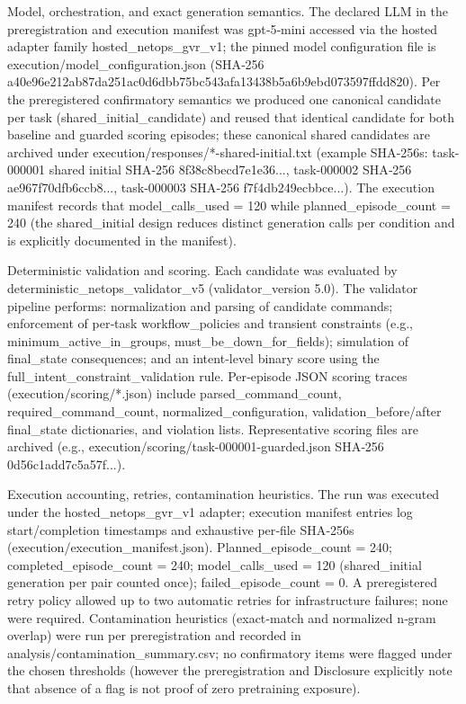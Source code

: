 \documentclass[conference]{IEEEtran}
\begin{document}
Model, orchestration, and exact generation semantics. The declared LLM in the preregistration and execution manifest was gpt‑5‑mini accessed via the hosted adapter family hosted\_netops\_gvr\_v1; the pinned model configuration file is execution/model\_configuration.json (SHA‑256 a40e96e212ab87da251ac0d6dbb75bc543afa13438b5a6b9ebd073597ffdd820). Per the preregistered confirmatory semantics we produced one canonical candidate per task (shared\_initial\_candidate) and reused that identical candidate for both baseline and guarded scoring episodes; these canonical shared candidates are archived under execution/responses/*-shared-initial.txt (example SHA‑256s: task-000001 shared initial SHA‑256 8f38c8becd7e1e36..., task-000002 SHA‑256 ae967f70dfb6ccb8..., task-000003 SHA‑256 f7f4db249ecbbce...). The execution manifest records that model\_calls\_used = 120 while planned\_episode\_count = 240 (the shared\_initial design reduces distinct generation calls per condition and is explicitly documented in the manifest).

Deterministic validation and scoring. Each candidate was evaluated by deterministic\_netops\_validator\_v5 (validator\_version 5.0). The validator pipeline performs: normalization and parsing of candidate commands; enforcement of per‑task workflow\_policies and transient constraints (e.g., minimum\_active\_in\_groups, must\_be\_down\_for\_fields); simulation of final\_state consequences; and an intent‑level binary score using the full\_intent\_constraint\_validation rule. Per‑episode JSON scoring traces (execution/scoring/*.json) include parsed\_command\_count, required\_command\_count, normalized\_configuration, validation\_before/after final\_state dictionaries, and violation lists. Representative scoring files are archived (e.g., execution/scoring/task-000001-guarded.json SHA‑256 0d56c1add7c5a57f...).

Execution accounting, retries, contamination heuristics. The run was executed under the hosted\_netops\_gvr\_v1 adapter; execution manifest entries log start/completion timestamps and exhaustive per‑file SHA‑256s (execution/execution\_manifest.json). Planned\_episode\_count = 240; completed\_episode\_count = 240; model\_calls\_used = 120 (shared\_initial generation per pair counted once); failed\_episode\_count = 0. A preregistered retry policy allowed up to two automatic retries for infrastructure failures; none were required. Contamination heuristics (exact‑match and normalized n‑gram overlap) were run per preregistration and recorded in analysis/contamination\_summary.csv; no confirmatory items were flagged under the chosen thresholds (however the preregistration and Disclosure explicitly note that absence of a flag is not proof of zero pretraining exposure).
\end{document}
